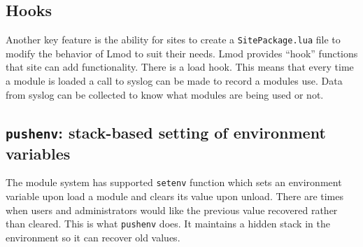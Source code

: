 \subsection{Hooks}

Another key feature is the ability for sites to create a
\texttt{SitePackage.lua} file to modify the behavior of Lmod to suit
their needs.  Lmod provides ``hook'' functions that site can add
functionality.  There is a load hook.  This means that
every time a module is loaded a call to syslog can be
made to record a modules use.  Data from syslog can be collected to
know what modules are being used or not.


\subsection{\texttt{pushenv}: stack-based setting of environment variables}
\label{sec:lmod_pushenv}

The module system
has supported \texttt{setenv} function which sets an environment variable
upon load a module and clears its value upon unload.  There are times
when users and administrators would like the previous value recovered
rather than cleared.  This is what \texttt{pushenv} does.  It
maintains a hidden stack in the environment so it can recover old
values.

